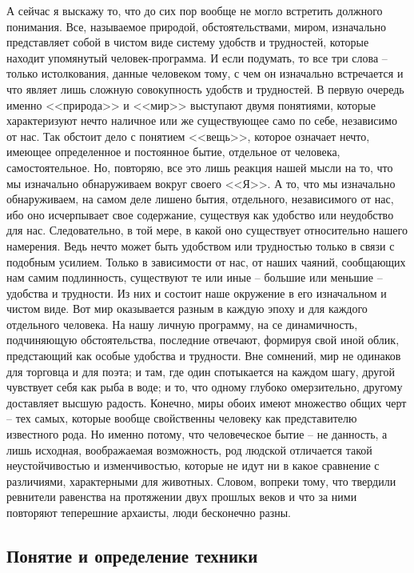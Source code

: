 А сейчас я выскажу то, что до сих пор вообще не могло встретить должного 
понимания. Все, называемое природой, обстоятельствами, миром, изначально 
представляет собой в чистом виде систему удобств и трудностей, которые находит 
упомянутый человек-программа. И если подумать, то все три слова -- только 
истолкования, данные человеком тому, с чем он изначально встречается и что 
являет лишь сложную совокупность удобств и трудностей. В первую очередь именно 
<<природа>> и <<мир>> выступают двумя понятиями, которые характеризуют нечто 
наличное или же существующее само по себе, независимо от нас. Так обстоит 
дело с понятием <<вещь>>, которое означает нечто, имеющее определенное и 
постоянное бытие, отдельное от человека, самостоятельное. Но, повторяю, все 
это лишь реакция нашей мысли на то, что мы изначально обнаруживаем вокруг 
своего <<Я>>. А то, что мы изначально обнаруживаем, на самом деле лишено 
бытия, отдельного, независимого от нас, ибо оно исчерпывает свое содержание, 
существуя как удобство или неудобство для нас. Следовательно, в той мере, в 
какой оно существует относительно нашего намерения. Ведь нечто может быть 
удобством или трудностью только в связи с подобным усилием. Только в 
зависимости от нас, от наших чаяний, сообщающих нам самим подлинность, 
существуют те или иные -- большие или меньшие -- удобства и трудности. Из них 
и состоит наше окружение в его изначальном и чистом виде. Вот мир оказывается 
разным в каждую эпоху и для каждого отдельного человека. На нашу личную 
программу, на се динамичность, подчиняющую обстоятельства, последние отвечают, 
формируя свой иной облик, предстающий как особые удобства и трудности. Вне 
сомнений, мир не одинаков для торговца и для поэта; и там, где один 
спотыкается на каждом шагу, другой чувствует себя как рыба в воде; и то, что 
одному глубоко омерзительно, другому доставляет высшую радость. Конечно, миры 
обоих имеют множество общих черт -- тех самых, которые вообще свойственны 
человеку как представителю известного рода. Но именно потому, что человеческое 
бытие -- не данность, а лишь исходная, воображаемая возможность, род людской 
отличается такой неустойчивостью и изменчивостью, которые не идут ни в какое 
сравнение с различиями, характерными для животных. Словом, вопреки тому, что 
твердили ревнители равенства на протяжении двух прошлых веков и что за ними 
повторяют теперешние архаисты, люди бесконечно разны. \cite{bib:04}

\subsection{Понятие и определение техники}

